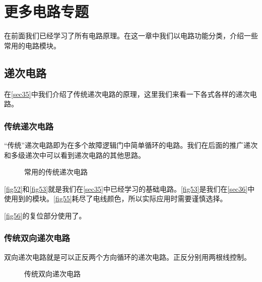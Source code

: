 \chapter{更多电路专题}

在前面我们已经学习了所有电路原理。在这一章中我们以电路功能分类，介绍一些常用的电路模块。

\section{递次电路}\label{sec2}
在\autoref{sec35}中我们介绍了传统递次电路的原理，这里我们来看一下各式各样的递次电路。

\subsection{传统递次电路}
“传统”递次电路即为在多个故障逻辑门中简单循环的电路。我们在后面的推广递次和多级递次中可以看到递次电路的其他思路。

\begin{figure}[!ht]
    \centering
	
	\caption{常用的传统递次电路}
\end{figure}

\autoref{fig52}和\autoref{fig53}就是我们在\autoref{sec35}中已经学习的基础电路。\autoref{fig53}是我们在\autoref{sec36}中使用到的模块。\autoref{fig55}耗尽了电线颜色，所以实际应用时需要谨慎选择。

\autoref{fig56}的复位部分使用了。

\subsection{传统双向递次电路}\label{sec3}
双向递次电路就是可以正反两个方向循环的递次电路。正反分别用两根线控制。

\begin{figure}[!ht]
    \centering
	
	\caption{传统双向递次电路}
\end{figure}

